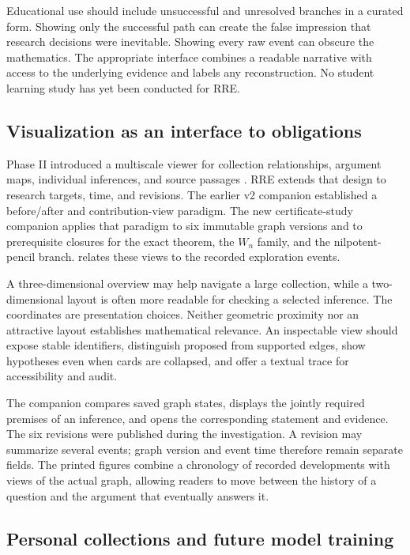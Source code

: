 Educational use should include unsuccessful and unresolved branches in a curated form. Showing only the successful path can create the false impression that research decisions were inevitable. Showing every raw event can obscure the mathematics. The appropriate interface combines a readable narrative with access to the underlying evidence and labels any reconstruction. No student learning study has yet been conducted for RRE.

\subsection{Visualization as an interface to obligations}\label{sec:visualization}

Phase II introduced a multiscale viewer for collection relationships, argument maps, individual inferences, and source passages \cite{xie2}. RRE extends that design to research targets, time, and revisions. The earlier v2 companion established a before/after and contribution-view paradigm. The new certificate-study companion applies that paradigm to six immutable graph versions and to prerequisite closures for the exact theorem, the $W_n$ family, and the nilpotent-pencil branch.  relates these views to the recorded exploration events.

A three-dimensional overview may help navigate a large collection, while a two-dimensional layout is often more readable for checking a selected inference. The coordinates are presentation choices. Neither geometric proximity nor an attractive layout establishes mathematical relevance. An inspectable view should expose stable identifiers, distinguish proposed from supported edges, show hypotheses even when cards are collapsed, and offer a textual trace for accessibility and audit.

The companion compares saved graph states, displays the jointly required premises of an inference, and opens the corresponding statement and evidence. The six revisions were published during the investigation. A revision may summarize several events; graph version and event time therefore remain separate fields. The printed figures combine a chronology of recorded developments with views of the actual graph, allowing readers to move between the history of a question and the argument that eventually answers it.

\subsection{Personal collections and future model training}

